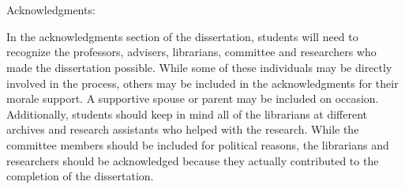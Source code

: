 \chapter*{\phantom{Acknowledgements}}

Acknowledgments:

In the acknowledgments section of the dissertation, students will need to recognize the professors, advisers, librarians, committee and researchers who made the dissertation possible. While some of these individuals may be directly involved in the process, others may be included in the acknowledgments for their morale support. A supportive spouse or parent may be included on occasion. Additionally, students should keep in mind all of the librarians at different archives and research assistants who helped with the research. While the committee members should be included for political reasons, the librarians and researchers should be acknowledged because they actually contributed to the completion of the dissertation.
